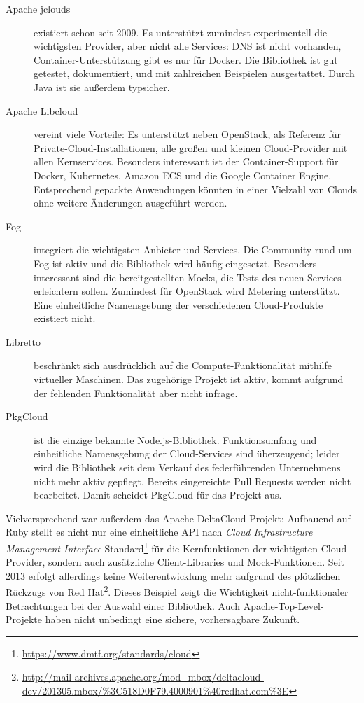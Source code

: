 \begin{description}
	
	\item[Apache jclouds] existiert schon seit 2009. Es unterstützt zumindest experimentell die wichtigsten Provider, aber nicht alle Services: DNS ist nicht vorhanden, Container-Unterstützung gibt es nur für Docker. Die Bibliothek ist gut getestet, dokumentiert, und mit zahlreichen Beispielen ausgestattet. Durch Java ist sie außerdem typsicher.

	\item[Apache Libcloud] vereint viele Vorteile: Es unterstützt neben OpenStack, als Referenz für Private-Cloud-Installationen, alle großen und kleinen Cloud-Provider mit allen Kernservices. Besonders interessant ist der Container-Support für Docker, Kubernetes, Amazon ECS und die Google Container Engine. Entsprechend gepackte Anwendungen könnten in einer Vielzahl von Clouds ohne weitere Änderungen ausgeführt werden.

	\item[Fog] integriert die wichtigsten Anbieter und Services. Die Community rund um Fog ist aktiv und die Bibliothek wird häufig eingesetzt. Besonders interessant sind die bereitgestellten Mocks, die Tests des neuen Services erleichtern sollen. Zumindest für OpenStack wird Metering unterstützt. Eine einheitliche Namensgebung der verschiedenen Cloud-Produkte existiert nicht.

	\item[Libretto] beschränkt sich ausdrücklich auf die Compute-Funktionalität mithilfe virtueller Maschinen. Das zugehörige Projekt ist aktiv, kommt aufgrund der fehlenden Funktionalität aber nicht infrage.

	\item[PkgCloud] ist die einzige bekannte Node.js-Bibliothek. Funktionsumfang und einheitliche Namensgebung der Cloud-Services sind überzeugend; leider wird die Bibliothek seit dem Verkauf des federführenden Unternehmens nicht mehr aktiv gepflegt. Bereits eingereichte Pull Requests werden nicht bearbeitet. Damit scheidet PkgCloud für das Projekt aus.

\end{description}

\noindent Vielversprechend war außerdem das Apache DeltaCloud-Projekt: Aufbauend auf Ruby stellt es nicht nur eine einheitliche API nach \emph{Cloud Infrastructure Management Interface}-Standard\footnote{\url{https://www.dmtf.org/standards/cloud}} für die Kernfunktionen der wichtigsten Cloud-Provider, sondern auch zusätzliche Client-Libraries und Mock-Funktionen. Seit 2013 erfolgt allerdings keine Weiterentwicklung mehr aufgrund des plötzlichen Rückzugs von Red Hat\footnote{\url{http://mail-archives.apache.org/mod_mbox/deltacloud-dev/201305.mbox/\%3C518D0F79.4000901\%40redhat.com\%3E}}. Dieses Beispiel zeigt die Wichtigkeit nicht-funktionaler Betrachtungen bei der Auswahl einer Bibliothek. Auch Apache-Top-Level-Projekte haben nicht unbedingt eine sichere, vorhersagbare Zukunft.

